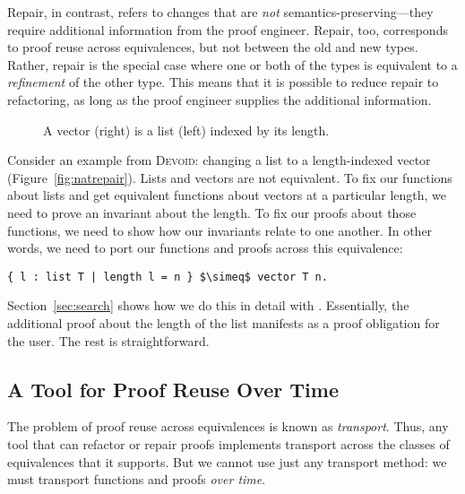 Repair, in contrast, refers to changes that are \textit{not} semantics-preserving---they require additional information
from the proof engineer.
Repair, too, corresponds to proof reuse across equivalences, but not between the old and new types.
Rather, repair is the special case where one or both of the types is equivalent to a \textit{refinement}
of the other type.
This means that it is possible to reduce repair to refactoring, as long as the proof engineer supplies the additional information.

\begin{figure}
\begin{minipage}{0.40\textwidth}
   
\end{minipage}
\hfill
\begin{minipage}{0.58\textwidth}
   
\end{minipage}
\caption{A vector (right) is a list (left) indexed by its length.}
\label{fig:listtovect}
\end{figure}

Consider an example from \textsc{Devoid}: changing a list to a length-indexed vector (Figure~\ref{fig:natrepair}).
Lists and vectors are not equivalent.
To fix our functions about lists and get equivalent functions about vectors at a particular length, we need to prove
an invariant about the length.
To fix our proofs about those functions, we need to show how our invariants relate to one another.
In other words, we need to port our functions and proofs across this equivalence:

\begin{lstlisting}
{ l : list T | length l = n } $\simeq$ vector T n.
\end{lstlisting}

Section~\ref{sec:search} shows how we do this in detail with \toolname.
Essentially, the additional proof about the length of the list manifests as a proof obligation for the user.
The rest is straightforward.

\subsection{A Tool for Proof Reuse Over Time}
\label{sec:time}

The problem of proof reuse across equivalences is known as \textit{transport}. %
Thus, any tool that can refactor or repair proofs implements transport across the classes
of equivalences that it supports.
But we cannot use just any transport method: we must transport functions and proofs \textit{over time}.


